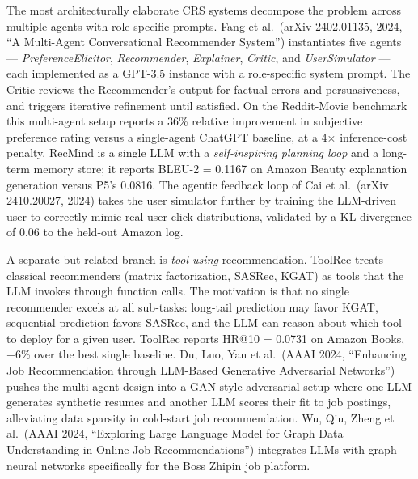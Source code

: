 \documentclass{article}
\begin{document}
The most architecturally elaborate CRS systems decompose the problem across multiple agents with role-specific prompts. Fang et al.~(arXiv 2402.01135, 2024, ``A Multi-Agent Conversational Recommender System'') instantiates five agents --- \emph{PreferenceElicitor}, \emph{Recommender}, \emph{Explainer}, \emph{Critic}, and \emph{UserSimulator} --- each implemented as a GPT-3.5 instance with a role-specific system prompt. The Critic reviews the Recommender's output for factual errors and persuasiveness, and triggers iterative refinement until satisfied. On the Reddit-Movie benchmark this multi-agent setup reports a 36\% relative improvement in subjective preference rating versus a single-agent ChatGPT baseline, at a 4× inference-cost penalty. RecMind \citep{wang2024recmindlargelangua} is a single LLM with a \emph{self-inspiring planning loop} and a long-term memory store; it reports BLEU-2 = 0.1167 on Amazon Beauty explanation generation versus P5's 0.0816. The agentic feedback loop of Cai et al.~(arXiv 2410.20027, 2024) takes the user simulator further by training the LLM-driven user to correctly mimic real user click distributions, validated by a KL divergence of 0.06 to the held-out Amazon log.

A separate but related branch is \emph{tool-using} recommendation. ToolRec \citep{zhao2024recommendersystems} treats classical recommenders (matrix factorization, SASRec, KGAT) as tools that the LLM invokes through function calls. The motivation is that no single recommender excels at all sub-tasks: long-tail prediction may favor KGAT, sequential prediction favors SASRec, and the LLM can reason about which tool to deploy for a given user. ToolRec reports HR@10 = 0.0731 on Amazon Books, +6\% over the best single baseline. Du, Luo, Yan et al.~(AAAI 2024, ``Enhancing Job Recommendation through LLM-Based Generative Adversarial Networks'') pushes the multi-agent design into a GAN-style adversarial setup where one LLM generates synthetic resumes and another LLM scores their fit to job postings, alleviating data sparsity in cold-start job recommendation. Wu, Qiu, Zheng et al.~(AAAI 2024, ``Exploring Large Language Model for Graph Data Understanding in Online Job Recommendations'') integrates LLMs with graph neural networks specifically for the Boss Zhipin job platform.
\end{document}
